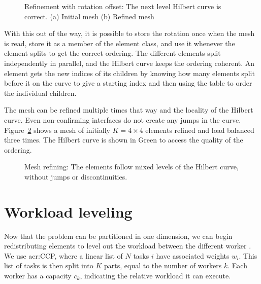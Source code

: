 \begin{figure}[H]
	\centering
	\hfill
	\caption{Refinement with rotation offset: The next level Hilbert curve is correct. (a) Initial mesh (b) Refined mesh}\label{fig:hilbert_correct}
\end{figure}

With this out of the way, it is possible to store the rotation once when the mesh is read, store it
as a member of the element class, and use it whenever the element splits to get the correct
ordering. The different elements split independently in parallel, and the Hilbert curve keeps the
ordering coherent. An element gets the new indices of its children by knowing how many elements
split before it on the curve to give a starting index and then using the table to order the
individual children.

The mesh can be refined multiple times that way and the locality of the Hilbert curve. Even
non-confirming interfaces do not create any jumps in the curve. Figure~\ref{fig:mesh_1_after2} shows
a mesh of initially \(K = 4 \times 4\) elements refined and load balanced three times. The Hilbert
curve is shown in Green to access the quality of the ordering.

\begin{figure}[H]
	\centering
	
	\caption{Mesh refining: The elements follow mixed levels of the Hilbert curve, without jumps or discontinuities.}\label{fig:mesh_1_after2}
\end{figure}

\section{Workload leveling}\label{section:load_balancing:workload_leveling}

Now that the problem can be partitioned in one dimension, we can begin redistributing elements to
level out the workload between the different worker . We use \acrlong{acr:CCP},
where a linear list of \(N\) tasks \(i\) have associated weights \(w_i\). This list of tasks is then
split into \(K\) parts, equal to the number of workers \(k\). Each worker has a capacity \(c_k\),
indicating the relative workload it can execute.

